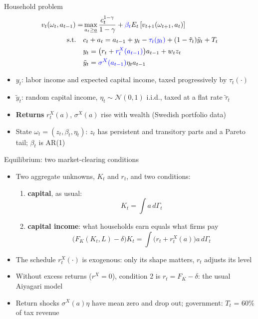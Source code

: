 \documentclass[10pt,english,10pt,handout]{beamer}
\begin{document}
\begin{frame}{Household problem}
\[
\begin{aligned}v_{t}(\omega_{t},a_{t-1})= & \max_{a_{t}\geq\underline{a}}\frac{c_{t}^{1-\gamma}}{1-\gamma}+\textcolor{blue}{\beta_{t}}E_{t}\left[v_{t+1}(\omega_{t+1},a_{t})\right]\\
\text{s.t.}\quad & c_{t}+a_{t}=a_{t-1}+y_{t}-\textcolor{blue}{\tau_{t}(y_{t})}+(1-\tilde{\tau}_{t})\tilde{y}_{t}+T_{t}\\
 & y_{t}=\big(r_{t}+\textcolor{blue}{r_{t}^{X}(a_{t-1})}\big)a_{t-1}+w_{t}z_{t}\\
 & \tilde{y}_{t}=\textcolor{blue}{\sigma^{X}(a_{t-1})}\eta_{t}a_{t-1}
\end{aligned}
\]
{\small
\begin{itemize}
\item $y_{t}$: labor income and expected capital income, taxed progressively by $\tau_{t}(\cdot)$
\item $\tilde{y}_{t}$: random capital income, $\eta_{t}\sim\mathcal{N}(0,1)$ i.i.d., taxed at a flat rate $\tilde{\tau}_{t}$
\item \textbf{Returns} $r_{t}^{X}(a)$, $\sigma^{X}(a)$ rise with wealth (Swedish portfolio data)
\item State $\omega_{t}=(z_{t},\beta_{t},\eta_{t})$: $z_{t}$ has persistent and transitory parts and a Pareto tail; $\beta_{t}$ is AR(1)
\end{itemize}}
\end{frame}

\begin{frame}{Equilibrium: two market-clearing conditions}
\begin{itemize}
\item Two aggregate unknowns, $K_{t}$ and $r_{t}$, and two conditions:
\begin{enumerate}
\item \textbf{capital}, as usual:
\[
K_{t}=\int a\,d\Gamma_{t}
\]
\item \textbf{capital income}: what households earn equals what firms pay
\[
\big(F_{K}(K_{t},L)-\delta\big)K_{t}=\int\big(r_{t}+r_{t}^{X}(a)\big)a\,d\Gamma_{t}
\]
\end{enumerate}
\item The schedule $r_{t}^{X}(\cdot)$ is exogenous: only its shape matters, $r_{t}$ adjusts its level
\item Without excess returns ($r^{X}=0$), condition 2 is $r_{t}=F_{K}-\delta$: the usual Aiyagari model
\item Return shocks $\sigma^{X}(a)\eta$ have mean zero and drop out; government: $T_{t}$ = 60\% of tax revenue
\end{itemize}
\end{frame}
\end{document}
